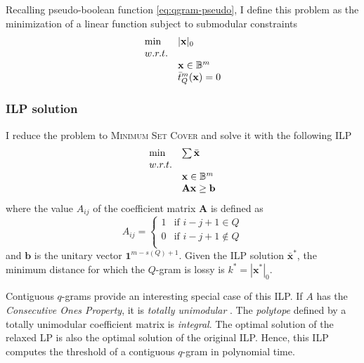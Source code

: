 Recalling pseudo-boolean function \ref{eq:qgram-pseudo}, I define this problem as the minimization of a linear function subject to submodular constraints
\begin{equation}
\begin{array}{ll}
\text{min} & |\mathbf{x}|_0			\\
w.r.t.								\\
& \mathbf{x} \in \mathbb {B}^m					\\
& \bar{t}_{Q}^{m}(\mathbf{x}) = 0	\\
\end{array}
\end{equation}

\subsubsection{ILP solution}

I reduce the problem to \textsc{Minimum Set Cover} \citep{Vazirani2001} and solve it with the following ILP
\begin{equation}
\begin{array}{ll}
\text{min} & \sum \bar{\mathbf{x}}	\\
w.r.t.						\\
& \mathbf{x} \in \mathbb {B}^m			\\
& \mathbf{A}\mathbf{x} \geq \mathbf{b}	\\
\end{array}
\end{equation}
where the value $A_{ij}$ of the coefficient matrix $\mathbf{A}$ is defined as
\begin{equation}
A_{ij} = 
\left\{
	\begin{array}{ll}
		1  & \mbox{if } i-j+1 \in Q		\\
		0  & \mbox{if } i-j+1 \notin Q	\\
	\end{array}
\right.
\end{equation}
and $\mathbf{b}$ is the unitary vector $\mathbf{1}^{m - s(Q) + 1}$.
Given the ILP solution $\bar{\mathbf{x}}^*$, the minimum distance for which the $Q$-gram is lossy is $k^* = |\mathbf{x}^*|_0$.

\begin{observation}
Contiguous $q$-grams provide an interesting special case of this ILP.
If $A$ has the \emph{Consecutive Ones Property}, it is \emph{totally unimodular} \citep{Fulkerson1964}.
The \emph{polytope} defined by a totally unimodular coefficient matrix is \emph{integral}.
The optimal solution of the relaxed LP is also the optimal solution of the original ILP.
Hence, this ILP computes the threshold of a contiguous $q$-gram in polynomial time.
\end{observation}

